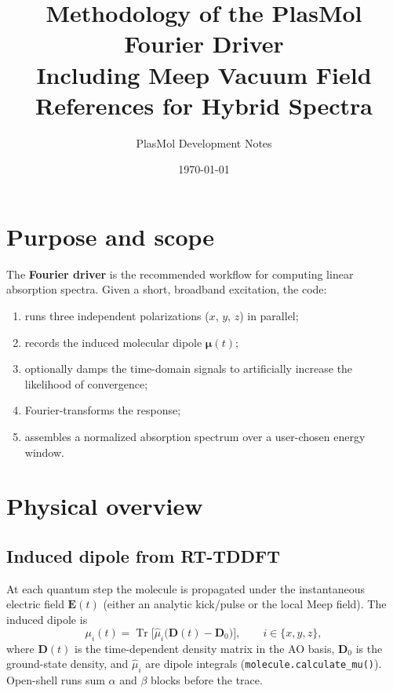 \documentclass[11pt,a4paper]{article}
\title{Methodology of the PlasMol Fourier Driver\\
\large Including Meep Vacuum Field References for Hybrid Spectra}
\author{PlasMol Development Notes}
\date{\today}
\begin{document}
\maketitle

\tableofcontents
\newpage

\section{Purpose and scope}

The \textbf{Fourier driver} is the recommended workflow for computing linear
absorption spectra.  Given a short, broadband excitation, the code:
\begin{enumerate}
  \item runs three independent polarizations ($x$, $y$, $z$) in parallel;
  \item records the induced molecular dipole $\boldsymbol{\mu}(t)$;
  \item optionally damps the time-domain signals to artificially increase the likelihood of convergence;
  \item Fourier-transforms the response;
  \item assembles a normalized absorption spectrum over a user-chosen energy
        window.
\end{enumerate}

\section{Physical overview}

\subsection{Induced dipole from RT-TDDFT}

At each quantum step the molecule is propagated under the instantaneous
electric field $\mathbf{E}(t)$ (either an analytic kick/pulse or the local
Meep field).  The induced dipole is
\begin{equation}
  \mu_i(t)
  =
  \operatorname{Tr}\!\big[
    \hat{\mu}_i \big(\mathbf{D}(t) - \mathbf{D}_0\big)
  \big],
  \qquad i \in \{x,y,z\},
  \label{eq:mu}
\end{equation}
where $\mathbf{D}(t)$ is the time-dependent density matrix in the AO basis, $\mathbf{D}_0$ is
the ground-state density, and $\hat{\mu}_i$ are dipole integrals
(\texttt{molecule.calculate\_mu()}).  Open-shell runs sum $\alpha$ and $\beta$
blocks before the trace.
\end{document}
